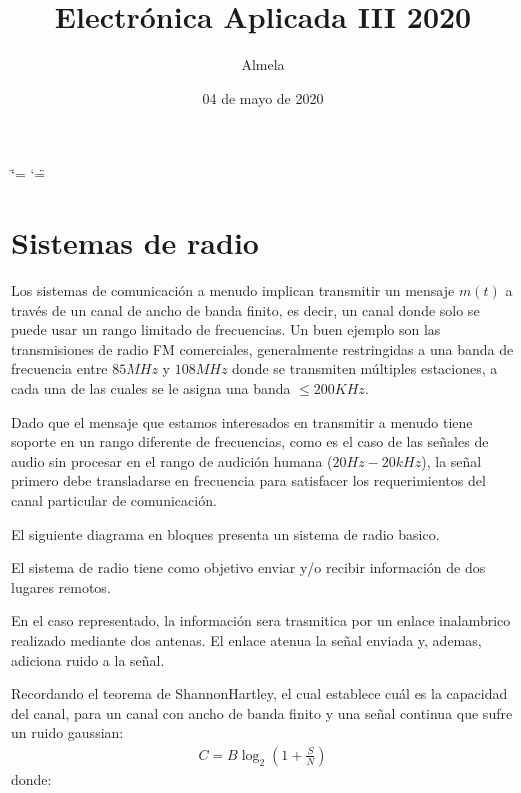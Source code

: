 \documentclass[letterpaper,11pt,spanish]{sphinxmanual}
\title{Electrónica Aplicada III 2020}
\date{04 de mayo de 2020}
\author{Almela}
\let\sphinxpxdimen\pdfpxdimen\else\newdimen\sphinxpxdimen
\begin{document}
\ifdefined\shorthandoff
  \ifnum\catcode`\=\string=\active\shorthandoff{=}\fi
  \ifnum\catcode`\"=\active{}\fi
\fi

\pagestyle{empty}
\sphinxmaketitle
\pagestyle{plain}
\sphinxtableofcontents
\pagestyle{normal}
\label{\detokenize{index::doc}}



\chapter{Sistemas de radio}
\label{\detokenize{introduccion/sistemas:Sistemas-de-radio}}\label{\detokenize{introduccion/sistemas::doc}}
Los sistemas de comunicación a menudo implican transmitir un mensaje \(m(t)\) a través de un canal de ancho de banda finito, es decir, un canal donde solo se puede usar un rango limitado de frecuencias. Un buen ejemplo son las transmisiones de radio FM comerciales, generalmente restringidas a una banda de frecuencia entre \(85MHz\) y \(108MHz\) donde se transmiten múltiples estaciones, a cada una de las cuales se le asigna una banda \(\le 200 KHz\).

Dado que el mensaje que estamos interesados en transmitir a menudo tiene soporte en un rango diferente de frecuencias, como es el caso de las señales de audio sin procesar en el rango de audición humana (\(20 Hz - 20 kHz\)), la señal primero debe transladarse en frecuencia para satisfacer los requerimientos del canal particular de comunicación.

El siguiente diagrama en bloques presenta un sistema de radio basico.

\sphinxincludegraphics[width=731\sphinxpxdimen,height=276\sphinxpxdimen]{{radio1}.png}

El sistema de radio tiene como objetivo enviar y/o recibir información de dos lugares remotos.

En el caso representado, la información sera trasmitica por un enlace inalambrico realizado mediante dos antenas. El enlace atenua la señal enviada y, ademas, adiciona ruido a la señal.

Recordando el teorema de Shannon\sphinxhyphen{}Hartley, el cual establece cuál es la capacidad del canal, para un canal con ancho de banda finito y una señal continua que sufre un ruido gaussian:
\begin{equation*}
\begin{split}C=B\log _{2}\left(1+{\frac {S}{N}}\right)\end{split}
\end{equation*}
donde:
\end{document}
